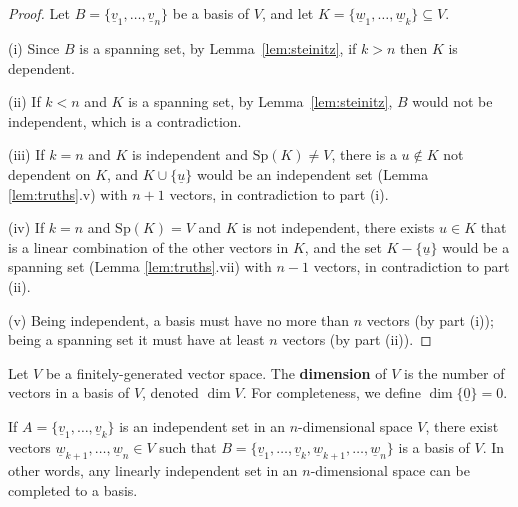 \begin{proof}
    Let $B = \{\underline{v}_1, \ldots, \underline{v}_n\}$ be a basis of $V$, and let $K = \{\underline{w}_1, \ldots, \underline{w}_k\} \subseteq V$.
    
    (i) Since $B$ is a spanning set, by Lemma~\ref{lem:steinitz}, if $k > n$ then $K$ is dependent.
    
    (ii) If $k < n$ and $K$ is a spanning set, by Lemma~\ref{lem:steinitz}, $B$ would not be independent, which is a contradiction.
    
    (iii) If $k = n$ and $K$ is independent and $\mathrm{Sp}(K) \neq V$, there is a $u \notin K$ not dependent on $K$, and $K \cup \{\underline{u}\}$ would be an independent set (Lemma \ref{lem:truths}.v) with $n+1$ vectors, in contradiction to part (i).
    
    (iv) If $k = n$ and $\mathrm{Sp}(K) = V$ and $K$ is not independent, there exists $u \in K$ that is a linear combination of the other vectors in $K$, and the set $K - \{\underline{u}\}$ would be a spanning set (Lemma \ref{lem:truths}.vii) with $n-1$ vectors, in contradiction to part (ii).
    
    (v) Being independent, a basis must have no more than $n$ vectors (by part (i)); being a spanning set it must have at least $n$ vectors (by part (ii)).
\end{proof}

\begin{definition}[Dimension]\label{def:dimension}
    Let $V$ be a finitely-generated vector space. The \textbf{dimension} of $V$ is the number of vectors in a basis of $V$, denoted $\dim V$. For completeness, we define $\dim \{\underline{0}\} = 0$.
\end{definition}

\begin{theorem}\label{thm:completion}
    If $A = \{\underline{v}_1, \ldots, \underline{v}_k\}$ is an independent set in an $n$-dimensional space $V$, there exist vectors $\underline{w}_{k+1}, \ldots, \underline{w}_n \in V$ such that $B = \{\underline{v}_1, \ldots, \underline{v}_k, \underline{w}_{k+1}, \ldots, \underline{w}_n\}$ is a basis of $V$. In other words, any linearly independent set in an $n$-dimensional space can be completed to a basis.
\end{theorem}
